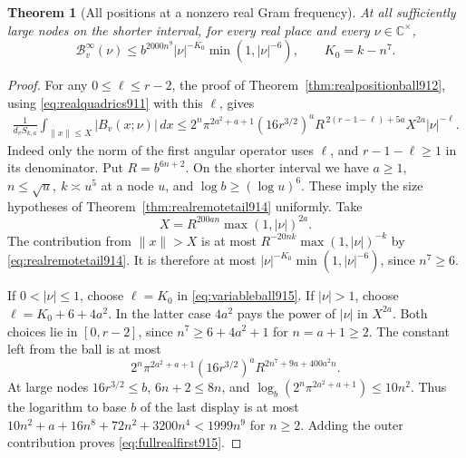 \documentclass[a4paper,11pt]{article}
\newtheorem{theorem}[proposition]{Theorem}
\theoremstyle{definition}
\theoremstyle{remark}
\numberwithin{equation}{section}
\begin{document}
\begin{theorem}[All positions at a nonzero real Gram frequency]
\leavevmode\label{thm:fullrealfirst915}
At all sufficiently large nodes on the shorter interval, for
every real place and every \(\nu\in\mathbb C^\times\),
\begin{equation}
       \mathcal B^\infty_v(\nu)
       \le b^{2000n^9}|\nu|^{-K_0}\min(1,|\nu|^{-6}),
       \qquad K_0=k-n^7 .
 \label{eq:fullrealfirst915}
\end{equation}
\end{theorem}
\begin{proof}
For any \(0\le\ell\le r-2\), the proof of
Theorem~\ref{thm:realpositionball912}, using
\eqref{eq:realquadrics911} with this \(\ell\), gives
\begin{align}
 \frac1{d_v S_{k,a}}\int_{\|x\|\le X}|B_v(x;\nu)|\,dx
 \le
  2^n\pi^{2a^2+a+1}(16r^{3/2})^a
  R^{\,2(r-1-\ell)+5a} X^{2a}|\nu|^{-\ell}.
 \label{eq:variableball915}
\end{align}
Indeed only the norm of the first angular operator uses
\(\ell\), and \(r-1-\ell\ge1\) in its denominator.
Put \(R=b^{6n+2}\). On the shorter interval we have \(a\ge1\),
\(n\le\sqrt u,\ k\asymp u^5\) at a node \(u\), and
\(\log b\ge(\log u)^6\). These imply the size hypotheses of
Theorem~\ref{thm:realremotetail914} uniformly. Take
\[
        X=R^{200an}\max(1,|\nu|)^{2a}.
\]
The contribution from \(\|x\|>X\) is at most
\(R^{-20nk}\max(1,|\nu|)^{-k}\) by \eqref{eq:realremotetail914}.
It is therefore at most
\(|\nu|^{-K_0}\min(1,|\nu|^{-6})\), since \(n^7\ge6\).

If \(0<|\nu|\le1\), choose \(\ell=K_0\) in
\eqref{eq:variableball915}. If \(|\nu|>1\), choose
\(\ell=K_0+6+4a^2\). In the latter case \(4a^2\) pays the
power of \(|\nu|\) in \(X^{2a}\).
Both choices lie in \([0,r-2]\), since \(n^7\ge6+4a^2+1\)
for \(n=a+1\ge2\). The constant left from the ball is at most
\[
    2^n\pi^{2a^2+a+1}(16r^{3/2})^a
                   R^{2n^7+9a+400a^2n}.
\]
At large nodes \(16r^{3/2}\le b\), \(6n+2\le 8n\), and
\(\log_b(2^n\pi^{2a^2+a+1})\le10n^2\).
Thus the logarithm to base \(b\) of the last display is at
most \(10n^2+a+16n^8+72n^2+3200n^4<1999n^9\) for \(n\ge2\).
Adding the outer contribution proves \eqref{eq:fullrealfirst915}.
\end{proof}
\end{document}
